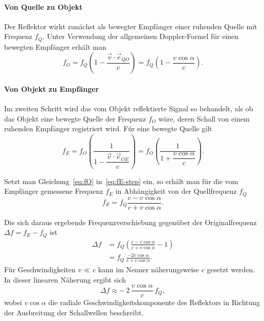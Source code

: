 \documentclass[
	german,%
	accentcolor=3d,%
	type=intern, %
	marginpar=false,%
]{tudapub}
\begin{document}
      \paragraph{Von Quelle zu Objekt} Der Reflektor wirkt zunächst als bewegter Empfänger einer ruhenden Quelle mit Frequenz \(f_Q\). Unter Verwendung der allgemeinen Doppler-Formel für einen bewegten Empfänger erhält man
      \begin{equation}
         f_O = f_Q\left(1 - \frac{\vec{v}\cdot\vec{e}_{QO}}{c}\right)
            = f_Q\left(1 - \frac{v\cos\alpha}{c}\right) .
         \label{eq:fO}
      \end{equation}

      \paragraph{Von Objekt zu Empfänger} Im zweiten Schritt wird das vom Objekt reflektierte Signal so behandelt, als ob das
      Objekt eine bewegte Quelle der Frequenz \(f_O\) wäre, deren Schall von einem ruhenden Empfänger registriert wird. Für eine bewegte Quelle gilt
      \begin{equation}
         f_E = f_O\left(\frac{1}{1 - \dfrac{\vec{v}\cdot\vec{e}_{OE}}{c}}\right)
            = f_O\left(\frac{1}{1 + \dfrac{v\cos\alpha}{c}}\right) .
         \label{eq:fE-step}
      \end{equation}

      Setzt man Gleichung~\eqref{eq:fO} in~\eqref{eq:fE-step} ein, so erhält man für die vom Empfänger gemessene Frequenz \(f_E\) in Abhängigkeit von der Quellfrequenz \(f_Q\)
      \begin{equation}
         f_E
         = f_Q \frac{c - v\cos\alpha}{c + v\cos\alpha} .
         \label{eq:fE-reflektor}
      \end{equation}

      Die sich daraus ergebende Frequenzverschiebung gegenüber der Originalfrequenz \(\Delta f = f_E - f_Q\) ist
      \begin{align}
         \Delta f
            &= f_Q\left(\frac{c - v\cos\alpha}{c + v\cos\alpha} - 1\right) \nonumber\\
            &= f_Q\,\frac{-2v\cos\alpha}{c + v\cos\alpha} . 
         \label{eq:Deltaf-exakt}
      \end{align}
      Für Geschwindigkeiten \(v \ll c\) kann im Nenner näherungsweise \(c\) gesetzt werden. In dieser linearen Näherung ergibt sich
      \begin{equation}
         \Delta f \approx -\,2\,\frac{v\cos\alpha}{c}\,f_Q ,
         \label{eq:Deltaf-approx}
      \end{equation}
      wobei \(v\cos\alpha\) die radiale Geschwindigkeitskomponente des Reflektors in Richtung der Ausbreitung der Schallwellen beschreibt.
\end{document}
